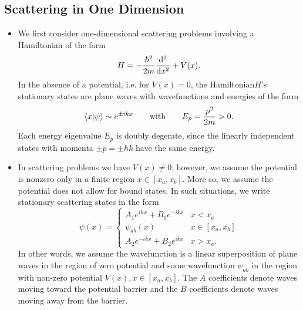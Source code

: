 \documentclass[11pt, a4paper]{article}
\newcommand{\Ham}{Hamiltonian\xspace}
\begin{document}
\subsection{Scattering in One Dimension}
\begin{itemize}
    \item We first consider one-dimensional scattering problems involving a \Ham of the form
    \begin{equation*}
        H = - \frac{\hbar^{2}}{2m}\dv[2]{}{x} + V(x).
    \end{equation*}
    In the absence of a potential, i.e. for $ V(x) = 0 $, the \Ham $ H $'s stationary states are plane waves with wavefunctions and energies of the form
    \begin{equation*}
        \braket{x}{\psi} \sim e^{\pm i kx} \qquad \text{with} \qquad E_{p} = \frac{p^{2}}{2m} > 0.
    \end{equation*}
    Each energy eigenvalue $ E_{p} $ is doubly degerate, since the linearly independent states with momenta $ \pm p = \pm \hbar k $ have the same energy.

    \item In scattering problems we have $ V(x) \neq 0 $; however, we assume the potential is nonzero only in a finite region $ x \in [x_{a}, x_{b}] $. More so, we assume the potential does not allow for bound states. In such situations, we write stationary scattering states in the form
    \begin{equation*}
        \psi(x) = 
        \begin{cases}
            A_{1} e^{ikx} + B_{1} e^{-ikx} & x < x_{a}\\
            \psi_{ab}(x) & x \in [x_{a}, x_{b}]\\
            A_{2} e^{-ikx} + B_{2} e^{ikx} & x > x_{a}.
        \end{cases}
    \end{equation*}
    In other words, we assume the wavefunction is a linear superposition of plane waves in the region of zero potential and some wavefunction $ \psi_{ab} $ in the region with non-zero potential $ V(x), x \in [x_{a}, x_{b}] $. The $ A $ coefficients denote waves moving toward the potential barrier and the $ B $ coefficients denote waves moving away from the barrier.


\end{itemize}
\end{document}
